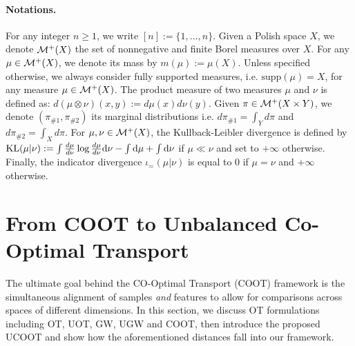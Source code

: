 \paragraph{Notations.} For any integer $n \geq 1$, we write $[n] := \{1,...,n\}$.
Given a Polish space $X$, we denote $\mathcal M^+(X)$ the set of nonnegative and finite Borel
measures over $X$. For any $\mu \in \mathcal M^+(X)$, we denote
its mass by $m(\mu) := \mu(X)$.
Unless specified otherwise, we always consider fully supported measures,
i.e. $\text{supp}(\mu) = X$, for any measure $\mu \in \mathcal M^+(X)$.
The product measure of two measures $\mu$ and $\nu$ is defined as:
$d (\mu \otimes \nu)(x,y) := d\mu(x) d\nu(y)$.
Given $\pi \in \mathcal M^{+}(X \times Y)$, we denote
$(\pi_{\#1}, \pi_{\#2})$ its marginal distributions i.e. $d\pi_{\#1} = \int_{Y} d\pi$ and
$d\pi_{\#2} = \int_{X} d\pi$.
For $\mu, \nu \in \mathcal M^+(X)$, the Kullback-Leibler divergence is defined by
$\text{KL}(\mu|\nu) := \int \frac{d \mu}{ d \nu} \log \frac{d \mu}{ d \nu} \mathrm d\nu
- \int \mathrm d\mu + \int \mathrm d\nu$ if $\mu \ll \nu$ and set to $+\infty$ otherwise.
Finally, the indicator divergence $\iota_{=}(\mu | \nu)$ is equal to 0 if $\mu = \nu$
and $+\infty$ otherwise.


\section{From COOT to Unbalanced Co-Optimal Transport} \label{sec:ucoot}
The ultimate goal behind the CO-Optimal Transport (COOT)
framework is the simultaneous alignment of samples \emph{and} features to allow for
comparisons across spaces of different dimensions. In this section, we discuss
OT formulations including OT, UOT, GW, UGW and COOT, then introduce the proposed UCOOT
and show how the aforementioned distances fall into our framework.


